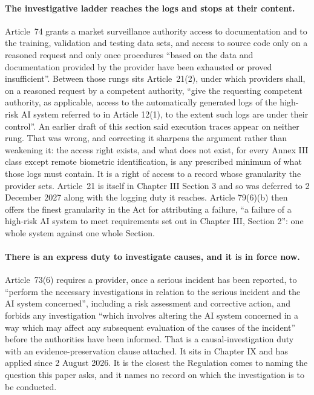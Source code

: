 \documentclass[11pt]{article}
\theoremstyle{remark}
\begin{document}
\paragraph{The investigative ladder reaches the logs and stops at their content.}
Article~74 grants a market surveillance authority access to documentation and to
the training, validation and testing data sets, and access to source code only
on a reasoned request and only once procedures ``based on the data and
documentation provided by the provider have been exhausted or proved
insufficient''. Between those rungs sits Article~21(2), under which providers
shall, on a reasoned request by a competent authority, ``give the requesting
competent authority, as applicable, access to the automatically generated logs
of the high-risk AI system referred to in Article 12(1), to the extent such logs
are under their control''. An earlier draft of this section said execution traces
appear on neither rung. That was wrong, and correcting it sharpens the argument
rather than weakening it: the access right exists, and what does not exist, for
every Annex III class except remote biometric identification, is any prescribed
minimum of what those logs must contain. It is a right of access to a record
whose granularity the provider sets. Article~21 is itself in Chapter III
Section 3 and so was deferred to 2 December 2027 along with the logging duty it
reaches. Article 79(6)(b) then offers the finest granularity in the Act for
attributing a failure, ``a failure of a high-risk AI system to meet requirements
set out in Chapter III, Section 2'': one whole system against one whole Section.

\paragraph{There is an express duty to investigate causes, and it is in force
now.} Article~73(6) requires a provider, once a serious incident has been
reported, to ``perform the necessary investigations in relation to the serious
incident and the AI system concerned'', including a risk assessment and
corrective action, and forbids any investigation ``which involves altering the AI
system concerned in a way which may affect any subsequent evaluation of the
causes of the incident'' before the authorities have been informed. That is a
causal-investigation duty with an evidence-preservation clause attached. It sits
in Chapter IX and has applied since 2 August 2026. It is the closest the
Regulation comes to naming the question this paper asks, and it names no record
on which the investigation is to be conducted.
\end{document}
